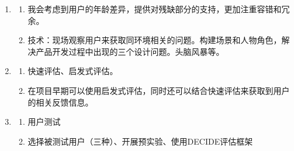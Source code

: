 \begin{solution}
\begin{enumerate}[label=\arabic*.]
    \item 
    \begin{enumerate}[label=(\arabic*)]
        \item 我会考虑到用户的年龄差异，提供对残缺部分的支持，更加注重容错和冗余。
        \item 技术：现场观察用户来获取同环境相关的问题。构建场景和人物角色，解决产品开发过程中出现的三个设计问题。头脑风暴等。
    \end{enumerate}
    \item 
    \begin{enumerate}[label=(\arabic*)]
        \item 快速评估、启发式评估。
        \item 在项目早期可以使用启发式评估，同时还可以结合快速评估来获取到用户的相关反馈信息。
    \end{enumerate}
    \item 
    \begin{enumerate}[label=(\arabic*)]
        \item 用户测试
        \item 选择被测试用户（三种）、开展预实验、使用DECIDE评估框架
    \end{enumerate}
\end{enumerate}
\end{solution}